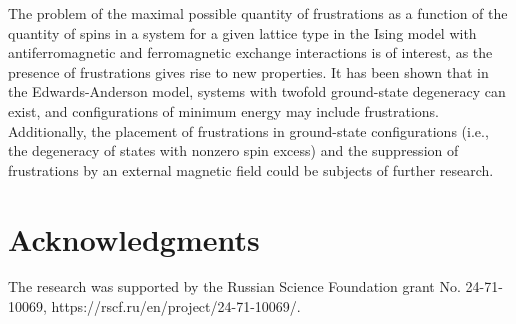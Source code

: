 \documentclass[preprint,12pt]{elsarticle}
\begin{document}
	The problem of the maximal possible quantity of frustrations as a function of the quantity of spins in a system for a given lattice type in the Ising model with antiferromagnetic and ferromagnetic exchange interactions is of interest, as the presence of frustrations gives rise to new properties. It has been shown that in the Edwards-Anderson model, systems with twofold ground-state degeneracy can exist, and configurations of minimum energy may include frustrations. Additionally, the placement of frustrations in ground-state configurations (i.e., the degeneracy of states with nonzero spin excess) and the suppression of frustrations by an external magnetic field could be subjects of further research.
	
	
	\section{Acknowledgments}
	
	The research was supported by the Russian Science Foundation grant No. 24-71-10069, https://rscf.ru/en/project/24-71-10069/.
	
	
	
	
\end{document}
